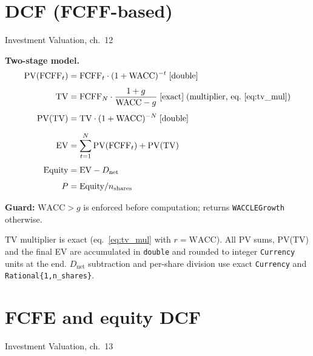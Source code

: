 \documentclass[11pt, a4paper, oneside]{article}
\newcommand{\FCFF}{\mathrm{FCFF}}
\newcommand{\WACC}{\mathrm{WACC}}
\newcommand{\EV}{\mathrm{EV}}
\newcommand{\TV}{\mathrm{TV}}
\newcommand{\exact}{\;\text{[exact]}}
\newcommand{\dbl}{\;\text{[double]}}
\begin{document}
\section{DCF (FCFF-based)}
\label{sec:dcf}

\begin{damodaran}{Investment Valuation, ch.~12}
\end{damodaran}

\textbf{Two-stage model.}
\begin{align}
  \mathrm{PV}(\FCFF_t) &= \FCFF_t \cdot (1+\WACC)^{-t} \dbl
  \label{eq:pv_fcff}\\[4pt]
  \TV &= \FCFF_N \cdot \frac{1+g}{\WACC - g} \exact\;\text{(multiplier, eq.~\ref{eq:tv_mul})}
  \label{eq:tv_dcf}\\[4pt]
  \mathrm{PV}(\TV) &= \TV \cdot (1+\WACC)^{-N} \dbl
  \label{eq:pv_tv}\\[6pt]
  \EV &= \sum_{t=1}^{N}\mathrm{PV}(\FCFF_t) + \mathrm{PV}(\TV)
  \label{eq:ev}\\[4pt]
  \text{Equity} &= \EV - D_\text{net}
  \label{eq:equity}\\[4pt]
  P &= \text{Equity} / n_\text{shares}
  \label{eq:price_dcf}
\end{align}

\textbf{Guard:} $\WACC > g$ is enforced before computation; returns
\texttt{WACCLEGrowth} otherwise.

\begin{impl}{}
$\TV$ multiplier is exact (eq.~\ref{eq:tv_mul} with $r=\WACC$).
All PV sums, PV(TV) and the final EV are accumulated in \texttt{double}
and rounded to integer \texttt{Currency} units at the end.
$D_\text{net}$ subtraction and per-share division use exact \texttt{Currency}
and \texttt{Rational\{1,n\_shares\}}.
\end{impl}

\section{FCFE and equity DCF}
\label{sec:fcfe}

\begin{damodaran}{Investment Valuation, ch.~13}
\end{damodaran}
\end{document}
